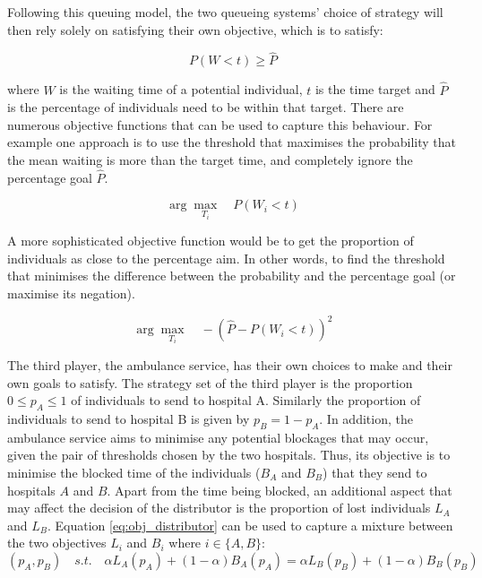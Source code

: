 Following this queuing model, the two queueing systems' choice of strategy will 
then rely solely on satisfying their own 
objective, which is to satisfy:

\begin{equation}
    P(W < t) \geq \hat{P}
\end{equation}

where \(W\) is the waiting time of a potential individual, \(t\) is the time 
target and \(\hat{P}\) is the percentage of individuals need to be within that 
target. 
There are numerous objective functions that can be used to capture this 
behaviour. 
For example one approach is to use the threshold that maximises the probability 
that 
the mean waiting is more than the target time, and completely ignore the 
percentage goal \(\hat{P}\).

\begin{equation}
    \arg \max_{T_i} \quad P(W_i < t)
\end{equation}

A more sophisticated objective function would be to get the proportion 
of individuals as close to the percentage aim. 
In other words, to find the threshold that minimises the difference between the 
probability and the percentage goal (or maximise its negation).

\begin{equation}\label{eq:obj_queueing_systems}
    \arg \max_{T_i} \quad -\left( \hat{P} - P(W_i < t) \right)^2
\end{equation}

The third player, the ambulance service, has their own choices to make and 
their own 
goals to satisfy.
The strategy set of the third player is the proportion \(0 \leq p_A \leq 1\) of 
individuals to send to hospital A.
Similarly the proportion of individuals to send to hospital B is given by
\(p_B = 1 - p_A\).
In addition, the ambulance service aims to minimise any potential blockages
that may occur, given the pair of thresholds chosen by the two hospitals.
Thus, its objective is to minimise the blocked time of the individuals 
(\(B_A\) and \(B_B\))
that they send to hospitals \(A\) and \(B\).
Apart from the time being blocked, an additional aspect that may affect the 
decision of the distributor is the proportion of lost individuals 
\(L_A\) and \(L_B\).
Equation \ref{eq:obj_distributor} can be used to capture a mixture 
between the two objectives \(L_i\) and \(B_i\) where \(i \in \{A, B\}\):
\begin{equation}\label{eq:obj_distributor}
    (p_A, p_B) \quad s.t. \quad 
    \alpha L_A(p_A) + (1 - \alpha) B_A(p_A) = 
    \alpha L_B(p_B) + (1 - \alpha) B_B(p_B)
\end{equation}

